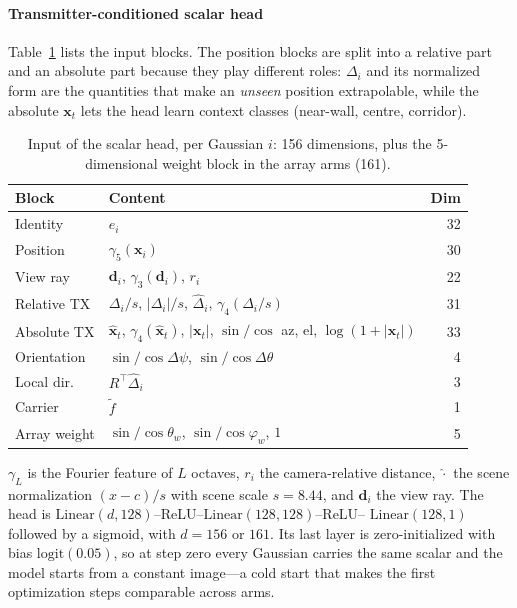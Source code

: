 \documentclass[conference]{IEEEtran}
\begin{document}
\paragraph{Transmitter-conditioned scalar head}
Table~\ref{tab:inputs} lists the input blocks. The position blocks are split
into a relative part and an absolute part because they play different roles:
$\Delta_i$ and its normalized form are the quantities that make an
\emph{unseen} position extrapolable, while the absolute $\mathbf{x}_t$ lets the
head learn context classes (near-wall, centre, corridor).

\begin{table}[!t]
\centering
\caption{Input of the scalar head, per Gaussian $i$: 156 dimensions, plus the
5-dimensional weight block in the array arms (161).}
\label{tab:inputs}
\footnotesize
\setlength{\tabcolsep}{3pt}
\begin{tabular}{@{}l>{\raggedright\arraybackslash}p{4.35cm}r@{}}
\toprule
Block & Content & Dim \\
\midrule
Identity & $e_i$ & 32 \\
Position & $\gamma_5(\mathbf{x}_i)$ & 30 \\
View ray & $\mathbf{d}_i$, $\gamma_3(\mathbf{d}_i)$, $r_i$ & 22 \\
Relative TX & $\Delta_i/s$, $|\Delta_i|/s$, $\widehat{\Delta}_i$,
$\gamma_4(\Delta_i/s)$ & 31 \\
Absolute TX & $\widehat{\mathbf{x}}_t$, $\gamma_4(\widehat{\mathbf{x}}_t)$,
$|\mathbf{x}_t|$, $\sin/\cos$ az, el, $\log(1+|\mathbf{x}_t|)$ & 33 \\
Orientation & $\sin/\cos\Delta\psi$, $\sin/\cos\Delta\theta$ & 4 \\
Local dir. & $R^{\top}\widehat{\Delta}_i$ & 3 \\
Carrier & $\tilde f$ & 1 \\
Array weight & $\sin/\cos\theta_w$, $\sin/\cos\varphi_w$, $1$ & 5 \\
\bottomrule
\end{tabular}
\end{table}

$\gamma_L$ is the Fourier feature of $L$ octaves, $r_i$ the camera-relative
distance, $\widehat{\cdot}$ the scene normalization $(x-c)/s$ with scene scale
$s=8.44$, and $\mathbf{d}_i$ the view ray. The head is
$\mathrm{Linear}(d,128)$--ReLU--$\mathrm{Linear}(128,128)$--ReLU--
$\mathrm{Linear}(128,1)$ followed by a sigmoid, with $d=156$ or $161$. Its last
layer is zero-initialized with bias $\mathrm{logit}(0.05)$, so at step zero
every Gaussian carries the same scalar and the model starts from a constant
image---a cold start that makes the first optimization steps comparable across
arms.
\end{document}
